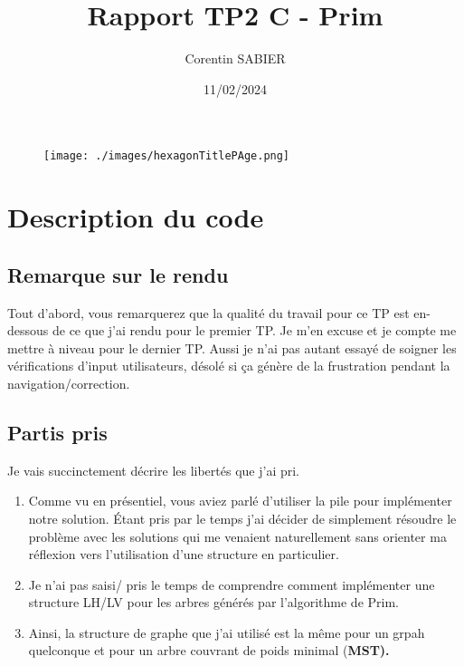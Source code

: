 \documentclass[12pt, a4paper,twoside]{article}
\title{Rapport TP2 C - Prim}
\author{Corentin SABIER}
\date{11/02/2024}
\begin{document}
    \begin{titlepage}
        \maketitle
        \begin{figure}[h!]
            \centering
            \texttt{[image: ./images/hexagonTitlePAge.png]}
        \end{figure}
    \end{titlepage}

    \tableofcontents

    \section{Description du code}

    \subsection{Remarque sur le rendu}

    Tout d'abord, vous remarquerez que la qualité du travail pour ce TP est en-dessous de ce que j'ai rendu pour le premier TP. Je m'en excuse et
    je compte me mettre à niveau pour le dernier TP. Aussi je n'ai pas autant essayé de soigner les vérifications d'input utilisateurs, désolé si
    ça génère de la frustration pendant la navigation/correction.

    \subsection{Partis pris}

    Je vais succinctement décrire les libertés que j'ai pri.

    \begin{enumerate}
        \item Comme vu en présentiel, vous aviez parlé d'utiliser la pile pour implémenter notre solution. Étant pris par le temps j'ai décider de simplement résoudre le problème avec les solutions qui
        me venaient naturellement sans orienter ma réflexion vers l'utilisation d'une structure en particulier.

        \item Je n'ai pas saisi/ pris le temps de comprendre comment implémenter une structure LH/LV pour les arbres générés par l'algorithme de Prim.

        \item Ainsi, la structure de graphe que j'ai utilisé est la même pour un grpah quelconque et pour un arbre couvrant de poids minimal (\bf{MST}).
    \end{enumerate}
\end{document}
